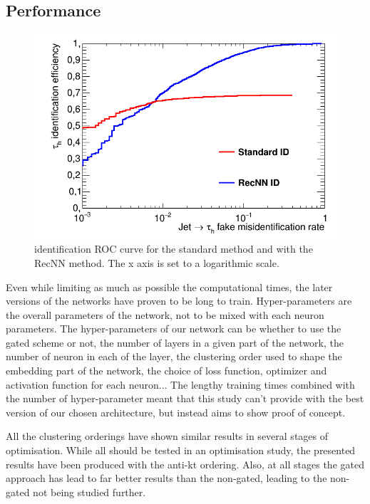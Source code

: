 \subsection{Performance}

\begin{figure}
    \centering
    \includegraphics[width=\textwidth]{Images/ROC_comp.png}
    \caption{\tauh identification ROC curve for the standard method and with the RecNN method. The x axis is set to a logarithmic scale.}
    \label{fig:RecNN_ROC}
\end{figure}

Even while limiting as much as possible the computational times, the later versions of the networks have proven to be long to train. Hyper-parameters are the overall parameters of the network, not to be mixed with each neuron parameters. The hyper-parameters of our network can be whether to use the gated scheme or not, the number of layers in a given part of the network, the number of neuron in each of the layer, the clustering order used to shape the embedding part of the network, the choice of loss function, optimizer and activation function for each neuron... The lengthy training times combined with the number of hyper-parameter meant that this study can't provide with the best version of our chosen architecture, but instead aims to show proof of concept.

All the clustering orderings have shown similar results in several stages of optimisation. While all should be tested in an optimisation study, the presented results have been produced with the anti-kt ordering. Also, at all stages the gated approach has lead to far better results than the non-gated, leading to the non-gated not being studied further.

